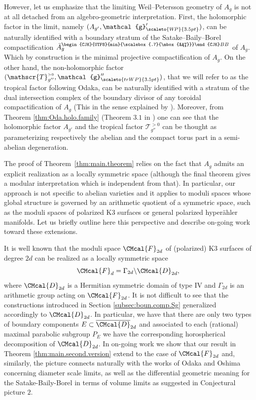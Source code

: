 \documentclass[11pt]{amsart}
\theoremstyle{plain}
\theoremstyle{definition}
\theoremstyle{remark}
\newcommand{\g}{\mathcal{g}}
\newcommand{\sbb}{\text{\begin{CJK}{UTF8}{min}{\scalebox{.7}{\mbox{さ}}}\end{CJK}}BB}
\newcommand{\WP}{\scaleto{W\!P}{3.5pt}}
\newcommand{\trWP}{\scaleto{trWP}{3.5pt}}
\newcommand{\cT}[1]{\mathscr{T}_{#1}^{\scriptscriptstyle{>0}}}
\begin{document}
However, let us emphasize that the limiting Weil--Petersson geometry of $A_g$ is not at all detached from an algebro-geometric interpretation. First, the holomorphic factor in the limit, namely $(A_{g'},\g'_{\WP})$, can be naturally identified with a boundary stratum of the Satake--Baily--Borel compactification $\bar A_g^{\sbb}$ of $A_g$. Which by construction is the minimal projective compactification of $A_g$. On the other hand, the non-holomorphic factor $(\cT{g''},\g''_{\trWP})$, that we will refer to as the tropical factor following Odaka, can be naturally identified with a stratum of the dual intersection complex of the boundary divisor of any toroidal compactification of $A_g$ (This in the sense explained by \cite{Odaka2019}). Moreover, from Theorem \ref{thm:Oda.holo.family} (Theorem $3.1$ in \cite{Odaka2019}) one can see that the holomorphic factor $A_{g'}$ and the tropical factor $\cT{g''}$ can be thought as parameterizing respectively the abelian and the compact torus part in a semi-abelian degeneration. 

The proof of Theorem~\ref{thm:main.theorem} relies on the fact that $A_g$ admits an explicit realization as a locally symmetric space (although the final theorem gives a modular interpretation which is independent from that). In particular, our approach is not specific to abelian varieties and it applies to moduli spaces whose global structure is governed by an arithmetic quotient of a symmetric space, such as the moduli spaces of polarized K3 surfaces or general polarized hyperähler manifolds. Let us briefly outline here this perspective and describe on-going work toward these extensions.

It is well known that the moduli space $\CMcal{F}_{2d}$ of (polarized) K3 surfaces of degree $2d$ can be realized as a locally symmetric space 
\begin{equation}
    \CMcal{F}_{d}=\Gamma_{2d}\backslash\CMcal{D}_{2d},
\end{equation}
where $\CMcal{D}_{2d}$ is a Hermitian symmetric domain of type $\mathrm{IV}$ and $\Gamma_{2d}$ is an arithmetic group acting on $\CMcal{F}_{2d}$. It is not difficult to see that the constructions introduced in Section \ref{subsec:boun.comp.Sg} generalized accordingly to $\CMcal{D}_{2d}$. In particular, we have that there are only two types of boundary components $E\subset \overline{\CMcal{D}}_{2d}$ and associated to each (rational) maximal parabolic subgroup $P_E$ we have the corresponding horospherical decomposition of $\CMcal{D}_{2d}$. In on-going work we show that our result in Theorem \ref{thm:main.second.version} extend to the case of $\CMcal{F}_{2d}$ and, similarly, the picture connects naturally with the works of Odaka and Oshima concerning diameter scale limits, as well as the differential geometric meaning for the Satake-Baily-Borel in terms of volume limits as suggested in \cite{spotti25} Conjectural picture $2$.
\end{document}
